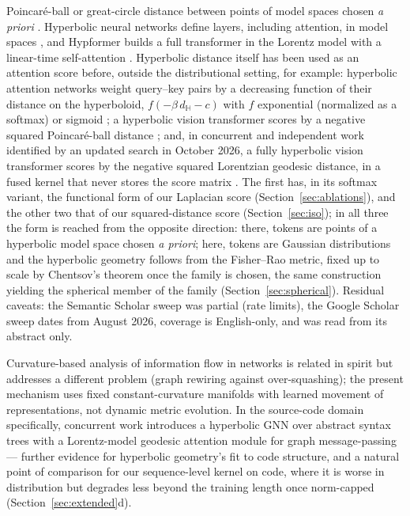 \documentclass[11pt]{article}
\begin{document}
Poincar\'e-ball or great-circle distance between points of model spaces chosen \emph{a priori} \cite{ge2026georesolver}. Hyperbolic neural networks define layers, including attention, in model spaces \cite{ganea2018hnn,shimizu2021hnnpp,chen2022fully}, and Hypformer builds a full transformer in the Lorentz model with a linear-time self-attention \cite{yang2024hypformer}. Hyperbolic distance itself has been used as an attention score before, outside the distributional setting, for example: hyperbolic attention networks weight query--key pairs by a decreasing function of their distance on the hyperboloid, $f(-\beta\, d_{\mathbb{H}} - c)$ with $f$ exponential (normalized as a softmax) or sigmoid \cite{gulcehre2019}; a hyperbolic vision transformer scores by a negative squared Poincar\'e-ball distance \cite{feinashley2024hvt}; and, in concurrent and independent work identified by an updated search in October 2026, a fully hyperbolic vision transformer scores by the negative squared Lorentzian geodesic distance, in a fused kernel that never stores the score matrix \cite{bdeir2026polar}. The first has, in its softmax variant, the functional form of our Laplacian score (Section~\ref{sec:ablations}), and the other two that of our squared-distance score (Section~\ref{sec:iso}); in all three the form is reached from the opposite direction: there, tokens are points of a hyperbolic model space chosen \emph{a priori}; here, tokens are Gaussian distributions and the hyperbolic geometry follows from the Fisher--Rao metric, fixed up to scale by Chentsov's theorem once the family is chosen, the same construction yielding the spherical member of the family (Section~\ref{sec:spherical}). Residual caveats: the Semantic Scholar sweep was partial (rate limits), the Google Scholar sweep dates from August 2026, coverage is English-only, and \cite{rubacher2026attention} was read from its abstract only.

Curvature-based analysis of information flow in networks \cite{topping2022} is related in spirit but addresses a different problem (graph rewiring against over-squashing); the present mechanism uses fixed constant-curvature manifolds with learned movement of representations, not dynamic metric evolution. In the source-code domain specifically, concurrent work introduces a hyperbolic GNN over abstract syntax trees with a Lorentz-model geodesic attention module for graph message-passing \cite{zhou2026hypecode} --- further evidence for hyperbolic geometry's fit to code structure, and a natural point of comparison for our sequence-level kernel on code, where it is worse in distribution but degrades less beyond the training length once norm-capped (Section~\ref{sec:extended}d).
\end{document}
